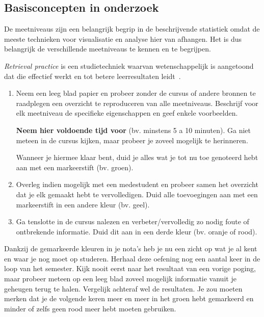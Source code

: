 \subsection{Basisconcepten in onderzoek}


\begin{exercise}
  \label{ex:retrieval-practice-meetniveaus}
  De meetniveaus zijn een belangrijk begrip in de beschrijvende statistiek omdat de meeste technieken voor visualisatie en analyse hier van afhangen. Het is dus belangrijk de verschillende meetniveaus te kennen en te begrijpen.
  
  \emph{Retrieval practice} is een studietechniek waarvan wetenschappelijk is aangetoond dat die effectief werkt en tot betere leerresultaten leidt~\parencite{RoedigerKarpicke2006}.
  
  \begin{enumerate}[label=\alph*.]
    \item Neem een leeg blad papier en probeer zonder de cursus of andere bronnen te raadplegen een overzicht te reproduceren van alle meetniveaus. Beschrijf voor elk meetniveau de specifieke eigenschappen en geef enkele voorbeelden.
    
    \textbf{Neem hier voldoende tijd voor} (bv. minstens 5 a 10 minuten). Ga niet meteen in de cursus kijken, maar probeer je zoveel mogelijk te herinneren.
    
    Wanneer je hiermee klaar bent, duid je alles wat je tot nu toe genoteerd hebt aan met een markeerstift (bv. groen).
    
    \item Overleg indien mogelijk met een medestudent en probeer samen het overzicht dat je elk gemaakt hebt te vervolledigen. Duid alle toevoegingen aan met een markeerstift in een andere kleur (bv. geel).
    
    \item Ga tenslotte in de cursus nalezen en verbeter/vervolledig zo nodig foute of ontbrekende informatie. Duid dit aan in een derde kleur (bv. oranje of rood).
  \end{enumerate}
  
  Dankzij de gemarkeerde kleuren in je nota's heb je nu een zicht op wat je al kent en waar je nog moet op studeren. Herhaal deze oefening nog een aantal keer in de loop van het semester. Kijk nooit eerst naar het resultaat van een vorige poging, maar probeer meteen op een leeg blad zoveel mogelijk informatie vanuit je geheugen terug te halen. Vergelijk achteraf wel de resultaten. Je zou moeten merken dat je de volgende keren meer en meer in het groen hebt gemarkeerd en minder of zelfs geen rood meer hebt moeten gebruiken.
\end{exercise}

